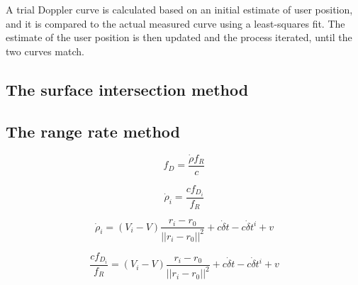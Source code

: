 A trial Doppler curve is calculated based on an initial estimate of user position, and it is compared to the actual measured curve using a least-squares fit. The estimate of the user position is then updated and the process iterated, until the two curves match\cite{sat16}.


\subsection{The surface intersection method}


\subsection{The range rate method}

\begin{equation}
    f_D = \frac{\dot\rho f_R}{c}
\end{equation}

\begin{equation}
    \dot\rho_i = \frac{c f_{D_i}}{f_R}
\end{equation}

\begin{equation}
    \dot\rho_i = (V_i - V) \frac{r_i - r_0}{||r_i - r_0||^2} + c \dot\delta t - c \dot \delta t^i + v
\end{equation}


\begin{equation}
    \frac{c f_{D_i}}{f_R} = (V_i - V) \frac{r_i - r_0}{||r_i - r_0||^2} + c \dot\delta t - c \dot \delta t^i + v
\end{equation}
